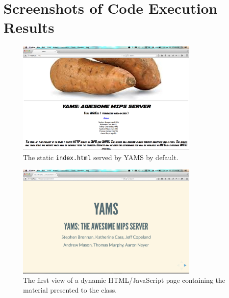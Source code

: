 \documentclass[journal,10pt]{IEEEtran}
\begin{document}
\appendices

\onecolumn %
\section{Screenshots of Code Execution Results}

\begin{figure}[H]
\centering
\includegraphics[width=0.8\textwidth,natwidth=1440,natheight=900]{static_document}
\caption{The static \texttt{index.html} served by YAMS by default.}
\label{fig:static_document}
\end{figure}

\begin{figure}[H]
\centering
\includegraphics[width=0.8\textwidth,natwidth=1440,natheight=900]{dynamic_document}
\caption{The first view of a dynamic HTML/JavaScript page containing the material presented to the class.}
\label{fig:dynamic_document}
\end{figure}
\end{document}
